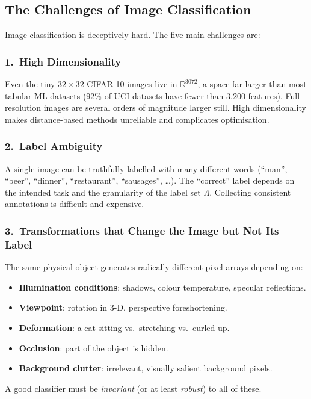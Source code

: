 \documentclass[11pt,a4paper]{article}
\begin{document}
\subsection{The Challenges of Image Classification}
\label{sec:image_classification_challenges}

Image classification is deceptively hard.  The five main challenges are:

\subsubsection{1.\ High Dimensionality}

Even the tiny $32 \times 32$ CIFAR-10 images live in $\mathbb{R}^{3072}$, a space far larger than
most tabular ML datasets (92\% of UCI datasets have fewer than 3{,}200 features).  Full-resolution
images are several orders of magnitude larger still.  High dimensionality makes distance-based methods
unreliable and complicates optimisation.

\subsubsection{2.\ Label Ambiguity}

A single image can be truthfully labelled with many different words (``man'', ``beer'', ``dinner'',
``restaurant'', ``sausages'', \ldots).  The ``correct'' label depends on the intended task and
the granularity of the label set $\Lambda$.  Collecting consistent annotations is difficult and
expensive.

\subsubsection{3.\ Transformations that Change the Image but Not Its Label}

The same physical object generates radically different pixel arrays depending on:
\begin{itemize}
  \item \textbf{Illumination conditions}: shadows, colour temperature, specular reflections.
  \item \textbf{Viewpoint}: rotation in 3-D, perspective foreshortening.
  \item \textbf{Deformation}: a cat sitting vs.\ stretching vs.\ curled up.
  \item \textbf{Occlusion}: part of the object is hidden.
  \item \textbf{Background clutter}: irrelevant, visually salient background pixels.
\end{itemize}
A good classifier must be \emph{invariant} (or at least \emph{robust}) to all of these.
\end{document}
